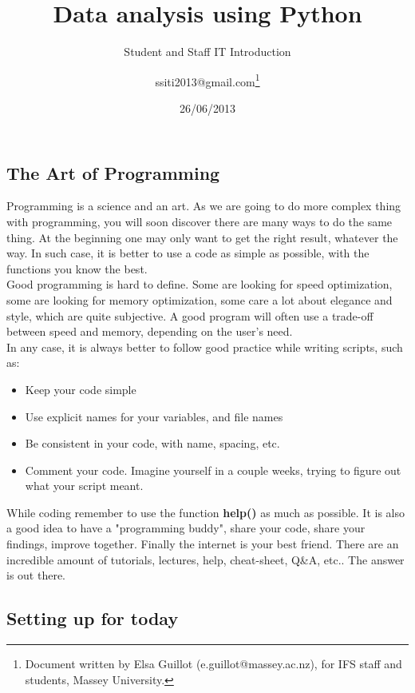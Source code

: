 \documentclass[article,10pt]{scrartcl}
\begin{document}
\title{Data analysis using Python}
\date{26/06/2013}
\subtitle{Student and Staff IT Introduction}
\author{ssiti2013@gmail.com\footnote{Document written by Elsa Guillot (e.guillot@massey.ac.nz), for IFS staff and students, Massey University.}}
\maketitle



\subsection*{The Art of Programming}
Programming is a science and an art. As we are going to do more complex thing with programming, you will soon discover there are many ways to do the same thing. At the beginning one may only want to get the right result, whatever the way. In such case, it is better to use a code as simple as possible, with the functions you know the best.\\
Good programming is hard to define. Some are looking for speed optimization, some are looking for memory optimization, some care a lot about elegance and style, which are quite subjective. A good program will often use a trade-off between speed and memory, depending on the user's need.
\\

In any case, it is always better to follow good practice while writing scripts, such as:
\begin{itemize}
\item Keep your code simple
\item Use explicit names for your variables, and file names
\item Be consistent in your code, with name, spacing, etc.
\item Comment your code. Imagine yourself in a couple weeks, trying to figure out what your script meant.
\end{itemize}

While coding remember to use the function \textbf{help()} as much as possible. It is also a good idea to have a "programming buddy", share your code, share your findings, improve together. Finally the internet is your best friend. There are an incredible amount of tutorials, lectures, help, cheat-sheet, Q\&A, etc.. The answer is out there.

\subsection*{Setting up for today}
\end{document}
